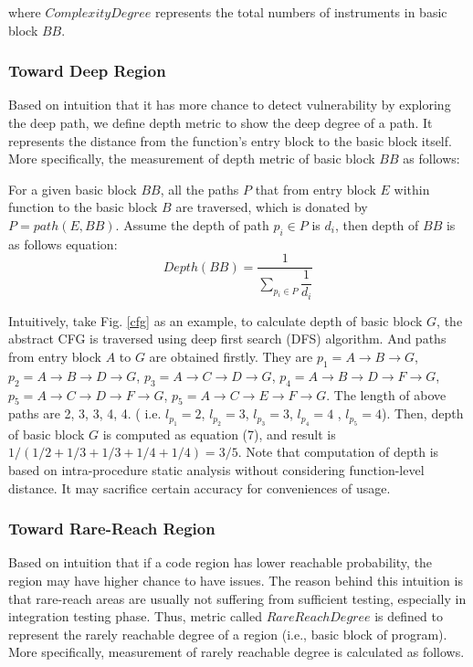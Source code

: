 where $ComplexityDegree$ represents the total numbers of instruments in basic block $BB$. 


\subsubsection{Toward Deep Region}

Based on intuition that it has more chance to detect vulnerability by exploring the deep path,  we define depth metric to show the deep degree of a path. It represents the distance from the function's entry block to the basic block itself. More specifically, the measurement of depth metric of basic block $BB$ as follows:

For a given basic block $BB$, all the paths $P$ that from entry block $E$ within function to the basic block $B$ are traversed, which is donated by $P=path(E,BB)$. Assume the depth of path $p_{i} \in P$ is $d_{i}$, then depth of $BB$ is as follows equation:
\begin{equation}
Depth(BB)= \dfrac{1}{ \sum_{p_{i} \in P}  \dfrac{1}{d_{i}}}
\end{equation}

Intuitively,  take Fig. \ref{cfg} as an example, to calculate depth of basic block $G$, the abstract CFG is traversed using deep first search (DFS) algorithm. And paths from entry block $A$ to $G$ are obtained firstly. They are $p_{1}=A\rightarrow B\rightarrow G$, $p_{2}=A\rightarrow B\rightarrow D\rightarrow G$,  $p_{3}=A\rightarrow C\rightarrow D\rightarrow G$, $p_{4}=A\rightarrow B\rightarrow D\rightarrow F \rightarrow G$, $p_{5}=A\rightarrow C\rightarrow D\rightarrow F \rightarrow G$, $p_{5}=A\rightarrow C\rightarrow E\rightarrow F \rightarrow G$.  The length of above paths are 2, 3, 3, 4, 4. ( i.e. $l_{p_{1}} = 2$, $l_{p_{2}}=3$, $l_{p_{3}}=3$, $l_{p_{4}}=4$ , $l_{p_{5}}=4$). Then, depth of basic block $G$ is computed as equation (7), and result is $1/(1/2 + 1/3 + 1/3 + 1/4 + 1/4) = 3/5$. Note that computation of depth is based on intra-procedure static analysis without considering function-level distance. It may sacrifice certain accuracy for conveniences of usage.

\subsubsection{Toward Rare-Reach Region}

Based on intuition that if a code region has lower reachable probability, the region may have higher chance to have issues. The reason behind this intuition is that rare-reach areas are usually not suffering from sufficient testing, especially in integration testing phase. Thus, metric called $RareReachDegree$ is defined to represent the rarely reachable degree of a region (i.e., basic block of program). More specifically, measurement of rarely reachable degree is calculated as follows.

